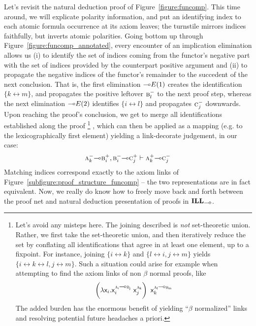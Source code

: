 Let's revisit the natural deduction proof of Figure~\ref{figure:funcomp}.
This time around, we will explicate polarity information, and put an identifying index to each atomic formula occurrence at its axiom leaves; 
the turnstile mirrors indices faithfully, but inverts atomic polarities.
Going bottom up through Figure~\ref{figure:funcomp_annotated}, every encounter of an implication elimination allows us (i) to identify the set of indices coming from the functor's negative part with the set of indices provided by the counterpart positive argument and (ii) to propagate the negative indices of the functor's remainder to the succedent of the next conclusion.
That is, the first elimination $\li E(1)$ creates the identification $\{k \leftrightarrow m\}$, and propagates the positive leftover $\normalfont\textsc{b}^{-}_l$ to the next proof step, whereas the next elimination $\li E(2)$ identifies $\{i \leftrightarrow l\}$ and propagates $\normalfont\textsc{c}^{-}_j$ downwards.
Upon reaching the proof's conclusion, we get to merge all identifications established along the proof%
\footnote{
Let's avoid any misteps here. The joining described is \textit{not} set-theoretic union. Rather, we first take the set-theoretic union, and then iteratively reduce the set by conflating all identifications that agree in at least one element, up to a fixpoint.
For instance, joining $\{ i \leftrightarrow k\}$ and $\{ l\leftrightarrow i, j \leftrightarrow m\}$ yields $\{i \leftrightarrow k \leftrightarrow l, j \leftrightarrow m \}$. Such a situation could arise for example when attempting to find the axiom links of non $\beta$ normal proofs, like
\[
\term{\left(\lam \vari.\vari^{\prop{a}_i \li \prop{b}_j}~\varj^{\prop{a}_k}\right)~\vark^{\prop{a}_l \li \prop{b}_m}}
\]
The added burden has the enormous benefit of yielding ``$\beta$ normalized'' links and resolving potential future headaches a priori.
}%
, which can then be applied as a mapping (e.g. to the lexicographically first element) yielding a link-decorate judgement, in our case:
\[
	\nprop{a}_k \li \pprop{b}_i, \nprop{b}_i \li \pprop{c}_j \vdash \pprop{a}_k \li \nprop{c}_j
\]
Matching indices correspond exactly to the axiom links of Figure~\ref{subfigure:proof_structure_funcomp} -- the two representations are in fact equivalent.
Now, we really do know how to freely move back and forth between the proof net and natural deduction presentation of proofs in $\ILL_{\li}$.

